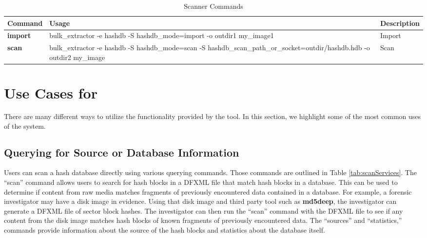 \documentclass[11pt,fleqn]{article} %
\begin{document}
\begin{table}[!ht]
\centering
\caption{\bulk \hash Scanner Commands}
\label{tab:hashdbScanner}
\begin{tabular}{|p{3.5 cm}|p{6 cm}|p{4 cm}|}
\hline \hline
\textbf{Command} & \textbf{Usage} & \textbf{Description} \\
\hline
\textbf{import} & bulk\_extractor -e hashdb -S hashdb\_mode=import -o outdir1 my\_image1 & Import \\
\hline
\textbf{scan} & bulk\_extractor -e hashdb -S hashdb\_mode=scan -S hashdb\_scan\_path\_or\_socket=outdir/hashdb.hdb -o outdir2 my\_image & Scan \\
\hline
\end{tabular}
\end{table}


\section{Use Cases for \hash}
There are many different ways to utilize the functionality provided by the \hash tool. In this section, we highlight some of the most common uses of the system. 


\subsection{Querying for Source or Database Information}
 Users can scan a hash database directly using various querying commands. Those commands are outlined in Table \ref{tab:scanServices}.  The ``scan'' command allows users to search for hash blocks in a DFXML file that match hash blocks in a database. This can be used to determine if content from raw media matches fragments of previously encountered data contained in a database. For example, a forensic investigator may have a disk image in evidence. Using that disk image and third party tool such as \textbf{md5deep}, the investigator can generate a DFXML file of sector block hashes. The investigator can then run the ``scan'' command with the DFXML file to see if any content from the disk image matches hash blocks of known fragments of previously encountered data. The ``sources'' and ``statistics,'' commands provide information about the source of the hash blocks and statistics about the database itself.
\end{document}
